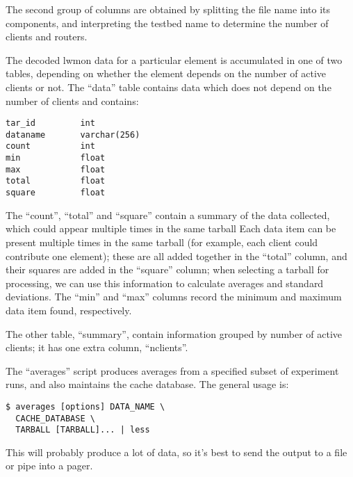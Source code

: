 \documentclass[a4paper,11pt,twocolumn]{article}
\begin{document}
The second group of columns are obtained by splitting the file name
into its components, and interpreting the testbed name to determine
the number of clients and routers.

The decoded lwmon data for a particular element is accumulated in one
of two tables, depending on whether the element depends on the number
of active clients or not.  The ``data'' table contains data which
does not depend on the number of clients and contains:

\begin{small}
\begin{verbatim}
tar_id         int
dataname       varchar(256)
count          int
min            float
max            float
total          float
square         float
\end{verbatim}
\end{small}

The ``count'', ``total'' and ``square'' contain a summary of the
data collected, which could appear multiple times in the same tarball
Each data item can be present multiple times in the same tarball
(for example, each client could contribute one element); these are
all added together in the ``total'' column, and their squares are
added in the ``square'' column; when selecting a tarball for
processing, we can use this information to calculate averages and
standard deviations. The ``min'' and ``max'' columns record the
minimum and maximum data item found, respectively.

The other table, ``summary'', contain information grouped by number of
active clients; it has one extra column, ``n{\textunderscore}clients''.

The ``averages'' script produces averages from a specified subset of
experiment runs, and also maintains the cache database.  The general
usage is:

\begin{small}
\begin{verbatim}
$ averages [options] DATA_NAME \
  CACHE_DATABASE \
  TARBALL [TARBALL]... | less
\end{verbatim}
\end{small}

This will probably produce a lot of data, so it's best to send the output
to a file or pipe into a pager.
\end{document}
